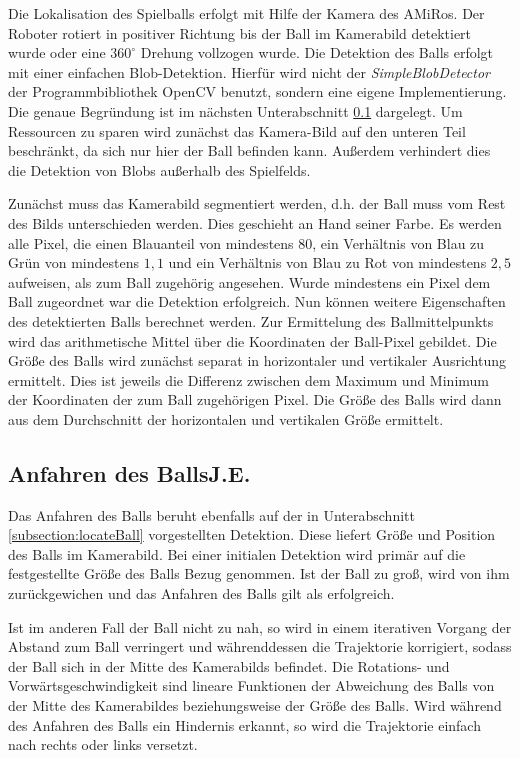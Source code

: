 Die Lokalisation des Spielballs erfolgt mit Hilfe der Kamera des AMiRos. Der Roboter rotiert in positiver Richtung bis der Ball im Kamerabild detektiert wurde oder eine $360^\circ$ Drehung vollzogen wurde. Die Detektion des Balls erfolgt mit einer einfachen Blob-Detektion. Hierfür wird nicht der \textit{SimpleBlobDetector} der Programmbibliothek OpenCV benutzt, sondern eine eigene Implementierung. Die genaue Begründung ist im nächsten Unterabschnitt \ref{subsection:moveToBall} dargelegt. Um Ressourcen zu sparen wird zunächst das Kamera-Bild auf den unteren Teil beschränkt, da sich nur hier der Ball befinden kann. Außerdem verhindert dies die Detektion von Blobs außerhalb des Spielfelds.

Zunächst muss das Kamerabild segmentiert werden, d.h. der Ball muss vom Rest des Bilds unterschieden werden.
Dies geschieht an Hand seiner Farbe. Es werden alle Pixel, die einen Blauanteil von mindestens 80, ein Verhältnis von Blau zu Grün von mindestens $1,1$ und ein Verhältnis von Blau zu Rot von mindestens $2,5$ aufweisen, als zum Ball zugehörig angesehen.
Wurde mindestens ein Pixel dem Ball zugeordnet war die Detektion erfolgreich. Nun können weitere Eigenschaften des detektierten Balls berechnet werden.
Zur Ermittelung des Ballmittelpunkts wird das arithmetische Mittel über die Koordinaten der Ball-Pixel gebildet.
Die Größe des Balls wird zunächst separat in horizontaler und vertikaler Ausrichtung ermittelt. Dies ist jeweils die Differenz zwischen dem Maximum und Minimum der Koordinaten der zum Ball zugehörigen Pixel. Die Größe des Balls wird dann aus dem Durchschnitt der horizontalen und vertikalen Größe ermittelt.

\subsection[Anfahren des Balls]{Anfahren des Balls\hfill {\normalsize J.E.}} %
\label{subsection:moveToBall}

Das Anfahren des Balls beruht ebenfalls auf der in Unterabschnitt \ref{subsection:locateBall} vorgestellten Detektion. Diese liefert Größe und Position des Balls im Kamerabild. Bei einer initialen Detektion wird primär auf die festgestellte Größe des Balls Bezug genommen. Ist der Ball zu groß, wird von ihm zurückgewichen und das Anfahren des Balls gilt als erfolgreich.

Ist im anderen Fall der Ball nicht zu nah, so wird in einem iterativen Vorgang der Abstand zum Ball verringert und währenddessen die Trajektorie korrigiert, sodass der Ball sich in der Mitte des Kamerabilds befindet. Die Rotations- und Vorwärtsgeschwindigkeit sind lineare Funktionen der Abweichung des Balls von der Mitte des Kamerabildes beziehungsweise der Größe des Balls.
Wird während des Anfahren des Balls ein Hindernis erkannt, so wird die Trajektorie einfach nach rechts oder links versetzt.

